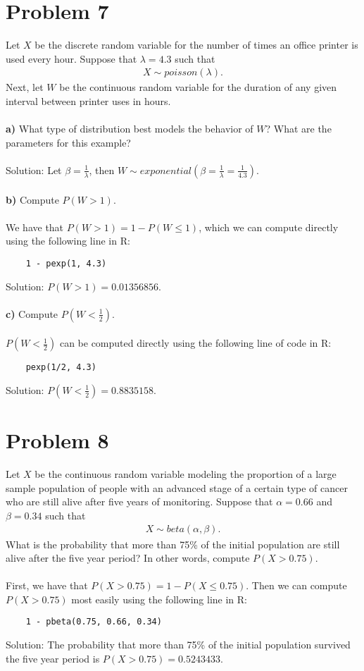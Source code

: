 \documentclass[11pt, letterpaper]{article}
\begin{document}
\section*{Problem 7}
Let $X$ be the discrete random variable for the number of times an office printer is used every hour. 
Suppose that $\lambda=4.3$ such that
\begin{align*}
    X\sim poisson(\lambda).
\end{align*}
Next, let $W$ be the continuous random variable for the duration of any given interval between printer uses in hours.\\\\
{\bf a)} What type of distribution best models the behavior of $W$? What are the parameters for this example?\\\\
Solution: Let $\beta=\frac{1}{\lambda}$, then $W\sim exponential(\beta=\frac{1}{\lambda}=\frac{1}{4.3})$.\\\\
{\bf b)} Compute $P(W>1)$.\\\\
We have that $P(W>1)=1-P(W\leq 1)$, which we can compute directly using the following line in R:
\begin{verbatim}
    1 - pexp(1, 4.3)
\end{verbatim}
Solution: $P(W>1)=0.01356856$.\\\\
{\bf c)} Compute $P(W<\frac{1}{2})$.\\\\
$P(W<\frac{1}{2})$ can be computed directly using the following line of code in R:
\begin{verbatim}
    pexp(1/2, 4.3)
\end{verbatim}
Solution: $P(W<\frac{1}{2})=0.8835158$.
\section*{Problem 8}
Let $X$ be the continuous random variable modeling the proportion of a large sample population of 
people with an advanced stage of a certain type of cancer who are still alive after five years of monitoring. 
Suppose that $\alpha=0.66$ and $\beta=0.34$ such that
\begin{align*}
    X\sim beta(\alpha, \beta).
\end{align*} 
What is the probability that more than 75\% of the initial population are still alive after the five year period?
In other words, compute $P(X>0.75)$.\\\\
First, we have that $P(X>0.75)=1-P(X\leq 0.75)$. Then we can compute $P(X>0.75)$ most easily using the following
line in R:
\begin{verbatim}
    1 - pbeta(0.75, 0.66, 0.34)
\end{verbatim}
Solution: The probability that more than 75\% of the initial population survived the five year period is $P(X>0.75)=0.5243433$.
\end{document}
